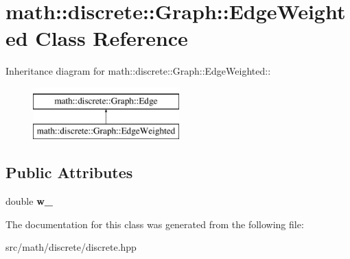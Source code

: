 \hypertarget{classmath_1_1discrete_1_1Graph_1_1EdgeWeighted}{
\section{math::discrete::Graph::EdgeWeighted Class Reference}
\label{classmath_1_1discrete_1_1Graph_1_1EdgeWeighted}
}
Inheritance diagram for math::discrete::Graph::EdgeWeighted::\begin{figure}[H]
\begin{center}
\leavevmode
\includegraphics[height=2cm]{classmath_1_1discrete_1_1Graph_1_1EdgeWeighted}
\end{center}
\end{figure}
\subsection*{Public Attributes}
\begin{DoxyCompactItemize}
\item 
\hypertarget{classmath_1_1discrete_1_1Graph_1_1EdgeWeighted_a868b0a21112736710da5e1f1ad16fed3}{
double {\bfseries w\_\-}}
\label{classmath_1_1discrete_1_1Graph_1_1EdgeWeighted_a868b0a21112736710da5e1f1ad16fed3}

\end{DoxyCompactItemize}


The documentation for this class was generated from the following file:\begin{DoxyCompactItemize}
\item 
src/math/discrete/discrete.hpp\end{DoxyCompactItemize}

